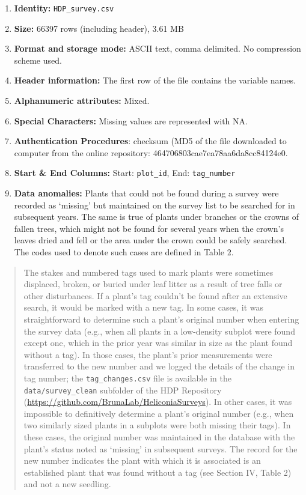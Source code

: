\documentclass[
  man, donotrepeattitle,floatsintext]{apa6}
\begin{document}
\begin{enumerate}
\def\labelenumi{\arabic{enumi}.}
\item
  \textbf{Identity:} \texttt{HDP\_survey.csv}
\item
  \textbf{Size:} 66397 rows (including header), 3.61 MB
\item
  \textbf{Format and storage mode:} ASCII text, comma delimited. No compression scheme used.
\item
  \textbf{Header information:} The first row of the file contains the variable names.
\item
  \textbf{Alphanumeric attributes:} Mixed.
\item
  \textbf{Special Characters:} Missing values are represented with NA.
\item
  \textbf{Authentication Procedures}: checksum (MD5 of the file downloaded to computer from the online repository: 464706803cae7ea78aa6da8cc84124e0.
\item
  \textbf{Start \& End Columns:} Start: \texttt{plot\_id}, End: \texttt{tag\_number}
\item
  \textbf{Data anomalies:} Plants that could not be found during a survey were recorded as `missing' but maintained on the survey list to be searched for in subsequent years. The same is true of plants under branches or the crowns of fallen trees, which might not be found for several years when the crown's leaves dried and fell or the area under the crown could be safely searched. The codes used to denote such cases are defined in Table 2.
\end{enumerate}

\begin{quote}
The stakes and numbered tags used to mark plants were sometimes displaced, broken, or buried under leaf litter as a result of tree falls or other disturbances. If a plant's tag couldn't be found after an extensive search, it would be marked with a new tag. In some cases, it was straightforward to determine such a plant's original number when entering the survey data (e.g., when all plants in a low-density subplot were found except one, which in the prior year was similar in size as the plant found without a tag). In those cases, the plant's prior measurements were transferred to the new number and we logged the details of the change in tag number; the \texttt{tag\_changes.csv} file is available in the \texttt{data/survey\_clean} subfolder of the HDP Repository (\url{https://github.com/BrunaLab/HeliconiaSurveys}). In other cases, it was impossible to definitively determine a plant's original number (e.g., when two similarly sized plants in a subplots were both missing their tags). In these cases, the original number was maintained in the database with the plant's status noted as `missing' in subsequent surveys. The record for the new number indicates the plant with which it is associated is an established plant that was found without a tag (see Section IV, Table 2) and not a new seedling.
\end{quote}
\end{document}
